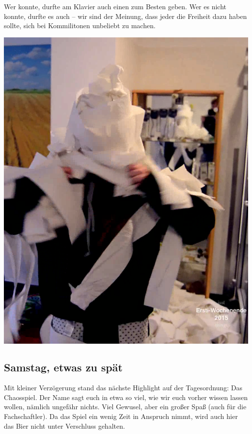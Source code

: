 \begin{multicols*}{2}
Wer konnte, durfte am Klavier auch einen zum Besten geben.
Wer es nicht konnte, durfte es auch -- wir sind der Meinung, dass jeder die Freiheit dazu haben sollte, sich bei Kommilitonen unbeliebt zu machen.

\begin{center}
	\includegraphics[width=\columnwidth, height=0.38\textheight]{res/erstiwe/klopapier-mumie.png}
\end{center}

\subsection{Samstag, etwas zu spät}
Mit kleiner Verzögerung stand das nächste Highlight auf der Tagesordnung:
Das Chaosspiel.
Der Name sagt euch in etwa so viel, wie wir euch vorher wissen lassen wollen, nämlich ungefähr nichts.
Viel Gewusel, aber ein großer Spaß (auch für die Fachschaftler).
Da das Spiel ein wenig Zeit in Anspruch nimmt, wird auch hier das Bier nicht unter Verschluss gehalten.


\end{multicols*}
